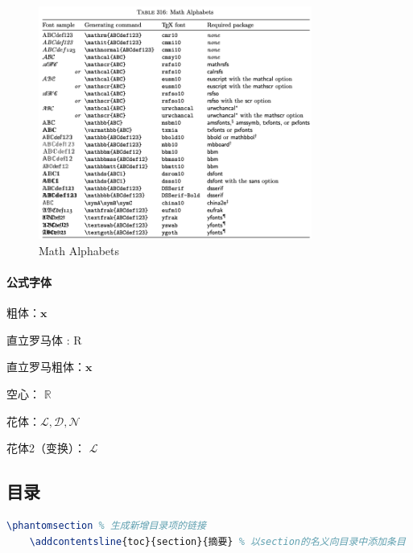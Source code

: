 \begin{figure}[h]
    \centering
    \includegraphics[width=0.8\textwidth]{figure/MathAlphabets.png}
    \caption{Math Alphabets}
\end{figure}

\paragraph{公式字体}
\begin{compactenum}
    \item 粗体：$\boldsymbol x$
    \item 直立罗马体 : $\mathrm R$
    \item 直立罗马粗体：$\mathbf x$
    \item 空心： $\mathbb R$
    \item 花体：$\mathcal {L,D,N}$
    \item 花体2（变换）： $\mathscr{L}$
\end{compactenum}

\subsection{目录}
\begin{lstlisting}[language={tex}]
    \phantomsection % 生成新增目录项的链接
    \addcontentsline{toc}{section}{摘要} % 以section的名义向目录中添加条目
\end{lstlisting}

